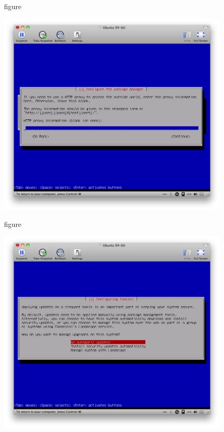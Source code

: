 \begin{nofloat}{figure}
\begin{center}
\includegraphics[width=0.85\textwidth]{screenshots/33_ubuntu_install.png}
\end{center}
\end{nofloat}

\begin{nofloat}{figure}
\begin{center}
\includegraphics[width=0.85\textwidth]{screenshots/34_ubuntu_install.png}
\end{center}
\end{nofloat}

